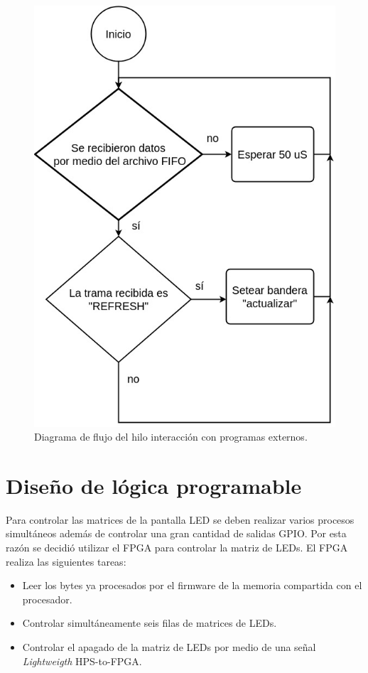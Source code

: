 \begin{figure}[htpb]
	\centering
	\includegraphics[scale=0.7]{Figures/hilo3.jpg} 
	\caption{Diagrama de flujo del hilo interacción con programas externos.}
	\label{fig: hilofifo}
\end{figure}
\pagebreak

\section{ Diseño de lógica programable}
Para controlar las matrices de la pantalla LED se deben realizar varios procesos simultáneos además de controlar una gran cantidad de salidas GPIO. Por esta razón se decidió utilizar el FPGA para controlar la matriz de LEDs.
El FPGA realiza las siguientes tareas:
\begin{itemize}
\item Leer los bytes ya procesados por el firmware de la memoria compartida con el procesador. 
\item Controlar simultáneamente seis filas de matrices de LEDs.
\item Controlar el apagado de la matriz de LEDs por medio de una señal \textit{Lightweigth} HPS-to-FPGA.
\end{itemize}

